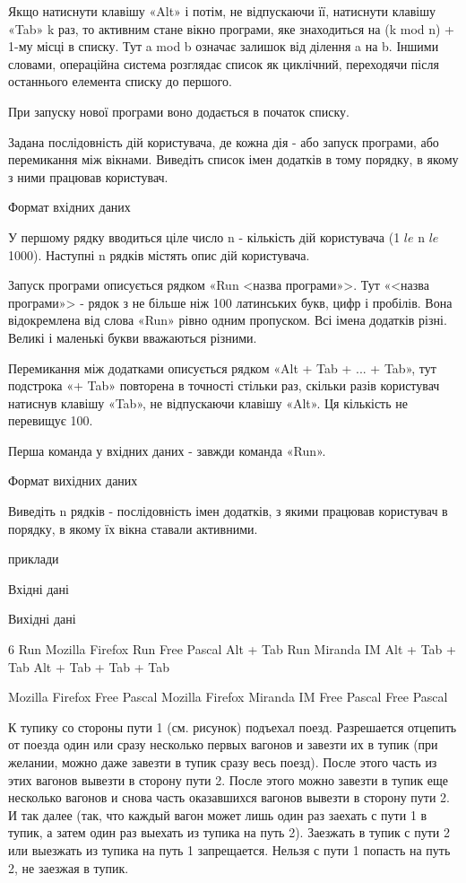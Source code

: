 \documentclass[]{article}
\begin{document}
Якщо натиснути клавішу «Alt» і потім, не відпускаючи її, натиснути клавішу «Tab» k раз, то активним стане вікно програми, яке знаходиться на (k mod n) + 1-му місці в списку. Тут a mod b означає залишок від ділення a на b. Іншими словами, операційна система розглядає список як циклічний, переходячи після останнього елемента списку до першого.

При запуску нової програми воно додається в початок списку.

Задана послідовність дій користувача, де кожна дія - або запуск програми, або перемикання між вікнами. Виведіть список імен додатків в тому порядку, в якому з ними працював користувач.

Формат вхідних даних

У першому рядку вводиться ціле число n - кількість дій користувача (1 $ le $ n $ le $ 1000). Наступні n рядків містять опис дій користувача.

Запуск програми описується рядком «Run <назва програми»>. Тут «<назва програми»> - рядок з не більше ніж 100 латинських букв, цифр і пробілів. Вона відокремлена від слова «Run» рівно одним пропуском. Всі імена додатків різні. Великі і маленькі букви вважаються різними.

Перемикання між додатками описується рядком «Alt + Tab + ... + Tab», тут подстрока «+ Tab» повторена в точності стільки раз, скільки разів користувач натиснув клавішу «Tab», не відпускаючи клавішу «Alt». Ця кількість не перевищує 100.

Перша команда у вхідних даних - завжди команда «Run».

Формат вихідних даних

Виведіть n рядків - послідовність імен додатків, з якими працював користувач в порядку, в якому їх вікна ставали активними.

приклади

Вхідні дані


Вихідні дані

 6
 Run Mozilla Firefox
 Run Free Pascal
 Alt + Tab
 Run Miranda IM
 Alt + Tab + Tab
 Alt + Tab + Tab + Tab



 Mozilla Firefox
 Free Pascal
 Mozilla Firefox
 Miranda IM
 Free Pascal
 Free Pascal 



К тупику со стороны пути 1 (см. рисунок) подъехал поезд. Разрешается отцепить от поезда один или сразу несколько первых вагонов и завезти их в тупик (при желании, можно даже завезти в тупик сразу весь поезд). После этого часть из этих вагонов вывезти в сторону пути 2. После этого можно завезти в тупик еще несколько вагонов и снова часть оказавшихся вагонов вывезти в сторону пути 2. И так далее (так, что каждый вагон может лишь один раз заехать с пути 1 в тупик, а затем один раз выехать из тупика на путь 2). Заезжать в тупик с пути 2 или выезжать из тупика на путь 1 запрещается. Нельзя с пути 1 попасть на путь 2, не заезжая в тупик.
\end{document}
